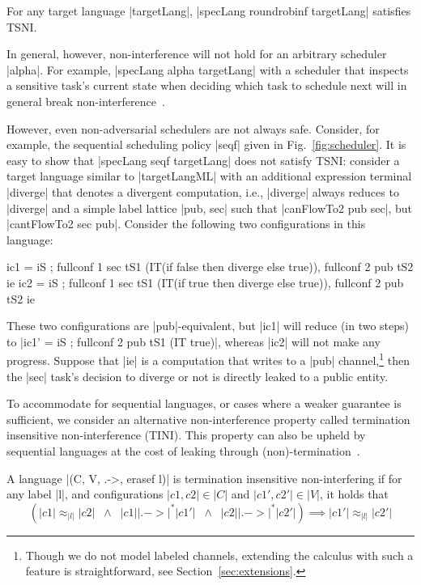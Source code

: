\begin{theorem}
  \label{thm:rr-tsni}
For any target language |targetLang|, |specLang roundrobinf
targetLang| satisfies TSNI.
\end{theorem}

In general, however, non-interference will not hold for an arbitrary scheduler |alpha|.
%
For example, |specLang alpha targetLang| with a scheduler that inspects a
sensitive task's current state when deciding which task to schedule next
will in general break non-interference~\cite{russo2006securing,BartheRRS07}.
%
%

However, even non-adversarial schedulers are not always safe.
Consider, for example, the sequential scheduling policy |seqf| given in
Fig.~\ref{fig:scheduler}.
%
It is easy to show that |specLang seqf targetLang| does not satisfy
TSNI:
%
consider a target language similar to |targetLangML| with an
additional expression terminal |diverge| that denotes a divergent computation,
i.e., |diverge| always reduces to |diverge| and a simple label lattice |{pub,
sec}| such that |canFlowTo2 pub sec|, but |cantFlowTo2 sec pub|.
Consider the following two configurations in this language:
\begin{code}
ic1 = iS ; fullconf 1 sec tS1 (IT(if false then diverge else true)),  fullconf 2 pub tS2 ie
ic2 = iS ; fullconf 1 sec tS1 (IT(if true then diverge else true)),   fullconf 2 pub tS2 ie
\end{code}
These two configurations are |pub|-equivalent, but |ic1| will reduce
(in two steps)
to |ic1' = iS ; fullconf 2 pub tS1 (IT true)|, whereas |ic2| will not make
any progress.
%
Suppose that |ie| is a computation that writes to a |pub| channel,\footnote{
Though we do not model labeled channels, extending the calculus with such a
feature is straightforward, see Section~\ref{sec:extensions}.}
then the |sec| task's decision to diverge or not is directly leaked to a
public entity.

%
To accommodate for sequential languages, or cases where a weaker guarantee
is sufficient, we consider an alternative non-interference property called termination insensitive
non-interference (TINI).  This property can also be upheld by sequential languages at the cost
of leaking through (non)-termination~\cite{Askarov:2008}.
%
\begin{definition}
  A language |(C, V, .->, erasef l)| is termination
  insensitive non-interfering if for any label |l|, and configurations
  $|c1, c2|\in|C|$ and $|c1', c2'|\in|V|$, it holds that
  \[
    (|c1| \approx_{|l|} |c2|
    \;\;\land\;\;
    |c1| |.->|^* |c1'|
    \;\;\land\;\;
    |c2| |.->|^* |c2'|)
    \implies
    |c1'| \approx_{|l|} |c2'|
  \]
\end{definition}

